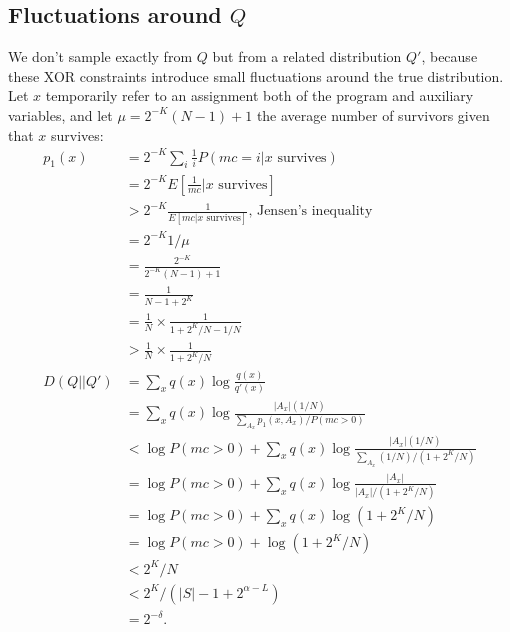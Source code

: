 \documentclass{article}
\begin{document}
\subsection{Fluctuations around $Q$}
We don't sample exactly from $Q$ but from a related distribution $Q'$, because these XOR constraints introduce small fluctuations around the true distribution.
Let $x$ temporarily refer to an assignment both of the program and auxiliary variables,
and let $\mu = 2^{-K}(N - 1) + 1$ the average number of survivors given that $x$ survives:
\begin{align}
  p_1(x)& = 2^{-K}\sum_i \frac{1}{i}P(mc = i | x \text{ survives})\\
  & = 2^{-K} E[\frac{1}{mc} | x \text{ survives}]\\
  &  >2^{-K}  \frac{1}{E[mc | x \text{ survives}]}\text{, Jensen's inequality}\\
  & = 2^{-K} 1/\mu\\
  & = \frac{2^{-K}}{2^{-K}(N - 1) + 1}\\
  & = \frac{1}{N - 1 + 2^K}\\
  & = \frac{1}{N} \times \frac{1}{1 + 2^K/N -1/N}\\
  & > \frac{1}{N}\times  \frac{1}{1 + 2^K/N }\\
  D(Q||Q')& = \sum_x q(x)\log \frac{q(x)}{q'(x)}\\
  & = \sum_x q(x)\log \frac{|A_x|(1/N)}{\sum_{A_x}p_1(x,A_x)/P(mc > 0)}\\
  &  <  \log P(mc > 0) +  \sum_x q(x)\log \frac{|A_x|(1/N)}{\sum_{A_x}(1/N)/(1 + 2^K/N)}\\
  & = \log P(mc > 0) +  \sum_x q(x)\log \frac{|A_x|}{|A_x|/(1 + 2^K/N)}\\
  & = \log P(mc > 0) +  \sum_x q(x)\log (1 + 2^K/N)\\
  & = \log P(mc > 0) +  \log (1 + 2^K/N)\\
  & < 2^K/N\\
  & < 2^K/(|S| - 1 + 2^{\alpha - L})\\
  & = 2^{ - \delta}.
\end{align}
\end{document}
